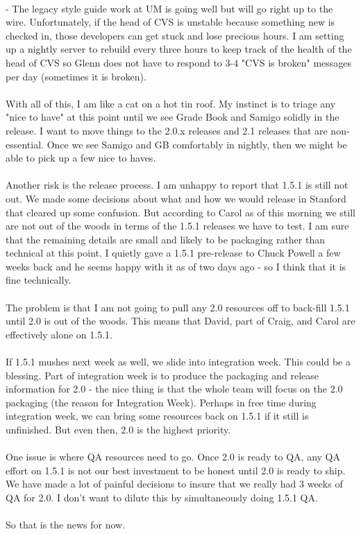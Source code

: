 \documentclass[12pt]{book}
\begin{document}
\begin{sf}
\\
- The legacy style guide work at UM is going well but
will go right up to the wire.  Unfortunately, if the
head of CVS is unstable because something new is
checked in, those developers can get stuck and lose
precious hours.  I am setting up a nightly server to
rebuild every three hours to keep track of the health
of the head of CVS so Glenn does not have to respond
to 3-4 "CVS is broken" messages per day (sometimes it
is broken).\\
\\
With all of this, I am like a cat on a hot tin roof.
My instinct is to triage any "nice to have" at this
point until we see Grade Book and Samigo solidly in
the release.  I want to move things to the 2.0.x
releases and 2.1 releases that are non-essential.
Once we see Samigo and GB comfortably in nightly,
then we might be able to pick up a few nice to haves.\\
\\
Another risk is the release process.  I am unhappy
to report that 1.5.1 is still not out.  We made some
decisions about what and how we would release in
Stanford that cleared up some confusion.  But
according to Carol as of this morning we still are
not out of the woods in terms of the 1.5.1 releases
we have to test.  I am sure that the remaining
details are small and likely to be packaging rather
than technical at this point.  I quietly gave a
1.5.1 pre-release to Chuck Powell a few weeks back
and he seems happy with it as of two days ago -
so I think that it is fine technically.\\
\\
The problem is that I am not going to pull any
2.0 resources off to back-fill 1.5.1 until 2.0 is
out of the woods.  This means that David, part of
Craig, and Carol are effectively alone on 1.5.1.\\
\\
If 1.5.1 mushes next week as well, we slide into
integration week.  This could be a blessing.  Part
of integration week is to produce the packaging and
release information for 2.0 - the nice thing is
that the whole team will focus on the 2.0 packaging
(the reason for Integration Week).  Perhaps in free
time during integration week, we can bring some
resources back on 1.5.1 if it still is unfinished.
But even then, 2.0 is the highest priority.\\
\\
One issue is where QA resources need to go.  Once
2.0 is ready to QA, any QA effort on 1.5.1 is not
our best investment to be honest until 2.0 is ready
to ship.  We have made a lot of painful decisions
to insure that we really had 3 weeks of QA for 2.0.
I don't want to dilute this by simultaneously doing
1.5.1 QA.\\
\\
So that is the news for now.\\
\end{sf}
\end{document}
